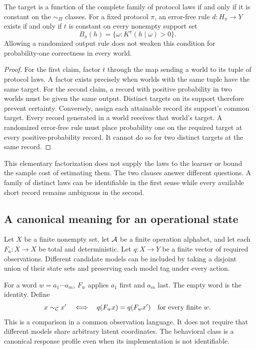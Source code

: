 \begin{GAproposition}\label{GA:prop:law}
The target is a function of the complete family of protocol laws if and only if it is constant on the $\sim_\Pi$ classes. For a fixed protocol $\pi$, an error-free rule $d:H_\pi\to Y$ exists if and only if $t$ is constant on every nonempty support set
\[
B_\pi(h)=\{\omega:K^\pi(h\mid\omega)>0\}.
\]
Allowing a randomized output rule does not weaken this condition for probability-one correctness in every world.
\end{GAproposition}
\begin{proof}
For the first claim, factor $t$ through the map sending a world to its tuple of protocol laws. A factor exists precisely when worlds with the same tuple have the same target. For the second claim, a record with positive probability in two worlds must be given the same output. Distinct targets on its support therefore prevent certainty. Conversely, assign each attainable record its support's common target. Every record generated in a world receives that world's target. A randomized error-free rule must place probability one on the required target at every positive-probability record. It cannot do so for two distinct targets at the same record.
\end{proof}

This elementary factorization does not supply the laws to the learner or bound the sample cost of estimating them. The two clauses answer different questions. A family of distinct laws can be identifiable in the first sense while every available short record remains ambiguous in the second.

\subsection{A canonical meaning for an operational state}
Let $X$ be a finite nonempty set, let $\mathcal A$ be a finite operation alphabet, and let each $F_a:X\to X$ be total and deterministic. Let $q:X\to Y$ be a finite vector of required observations. Different candidate models can be included by taking a disjoint union of their state sets and preserving each model tag under every action.

For a word $w=a_1\cdots a_m$, $F_w$ applies $a_1$ first and $a_m$ last. The empty word is the identity. Define
\[
x\sim_\mathcal C x'\quad\Longleftrightarrow\quad
q(F_wx)=q(F_wx')\quad\text{for every finite }w.
\]
This is a comparison in a common observation language. It does not require that different models share arbitrary latent coordinates. The behavioral class is a canonical response profile even when its implementation is not identifiable.


